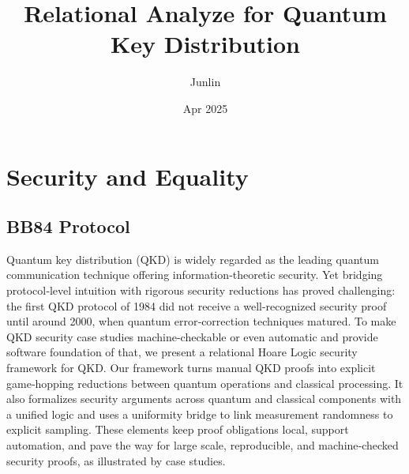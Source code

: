 \documentclass{report}
\title{Relational Analyze for Quantum Key Distribution}
\author{Junlin}
\date{Apr 2025}
\theoremstyle{defn_style}
\begin{document}
\maketitle


\chapter{Security and Equality}


\section{BB84 Protocol}


Quantum key distribution (QKD) is widely regarded as the leading quantum communication technique offering information‑theoretic security. Yet bridging protocol‑level intuition with rigorous security reductions has proved challenging: the first QKD protocol of 1984 did not receive a well-recognized security proof until around 2000, when quantum error‑correction techniques matured. To make QKD security case studies machine-checkable or even automatic and provide software foundation of that, we present a relational Hoare Logic security framework for QKD. Our framework turns manual QKD proofs into explicit game‑hopping reductions between quantum operations and classical processing. It also formalizes security arguments across quantum and classical components with a unified logic and uses a uniformity bridge to link measurement randomness to explicit sampling. These elements keep proof obligations local, support automation, and pave the way for large scale, reproducible, and machine‑checked security proofs, as illustrated by case studies.
\end{document}
